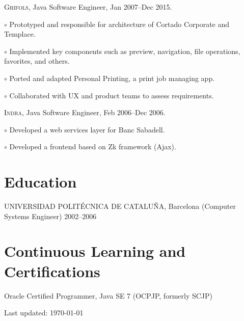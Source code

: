 \documentclass[letterpaper]{article}
\renewenvironment{itemize}{
  \begin{list}{}{
    \setlength{\leftmargin}{1.5em}
  }
}{
  \end{list}
}
\newenvironment{no-indent-itemize}{
  \begin{list}{}{
    \setlength{\leftmargin}{0em}
  }
}{
  \end{list}
}
\def\bullet{$\circ$\xspace}
\begin{document}
\begin{no-indent-itemize}
\begin{itemize}
  \end{itemize}
  \item \textsc{Grifols}, Java Software Engineer, Jan 2007--Dec 2015.
  \begin{itemize}
    \item\bullet Prototyped and responsible for architecture of Cortado Corporate and Templace.
    \item\bullet Implemented key components such as preview, navigation, file operations, favorites, and others.
    \item\bullet Ported and adapted Personal Printing, a print job managing app.
    \item\bullet Collaborated with UX and product teams to assess requirements.
  \end{itemize}
  \item \textsc{Indra}, Java Software Engineer, Feb 2006--Dec 2006. 
  \begin{itemize}
    \item\bullet Developed a web services layer for Banc Sabadell.
    \item\bullet Developed a frontend based on Zk framework (Ajax).
  \end{itemize}
\end{no-indent-itemize}

\section*{Education}
\begin{no-indent-itemize}
  \item UNIVERSIDAD POLITÉCNICA DE CATALUÑA, Barcelona (Computer Systems Engineer) 2002--2006
\end{no-indent-itemize}

\section*{Continuous Learning and Certifications}
\begin{no-indent-itemize}
  \item Oracle Certified Programmer, Java SE 7 (OCPJP, formerly SCJP)
\end{no-indent-itemize}


\bigskip
\begin{center}
  \begin{footnotesize}
    Last updated: \today \\
    \href{\footerlink}{\texttt{\footerlink}}
  \end{footnotesize}
\end{center}
\end{document}
